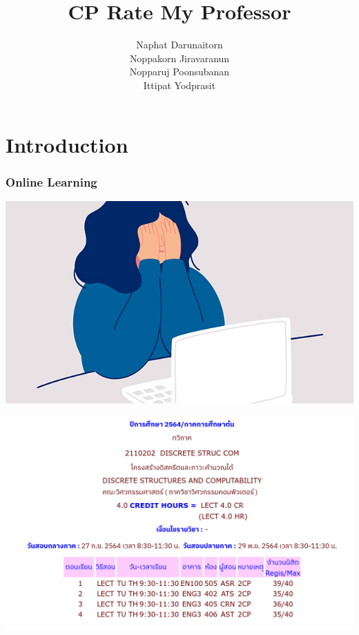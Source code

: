 \documentclass[aspectratio=169]{beamer}
\title{CP Rate My Professor}
\author[CP Rate My Professor Team]{Naphat Darunaitorn\\Noppakorn Jiravaranun\\Nopparuj Poonsubanan\\Ittipat Yodprasit}
\begin{document}
\frame{\titlepage}
\section{Introduction}
\begin{frame}
    \frametitle{Online Learning}
    \centering
    \includegraphics[scale=0.5]{online_learning.jpg}
\end{frame}
\begin{frame}
    \centering
    \includegraphics[scale=0.4]{discrete_section.png}
\end{frame}
\end{document}
